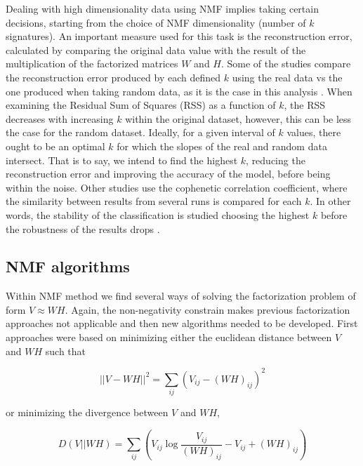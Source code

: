 Dealing with high dimensionality data using NMF implies taking certain decisions, starting from the choice of NMF dimensionality (number of \(k\) signatures). An important measure used for this task is the reconstruction error, calculated by comparing the original data value with the result of the multiplication of the factorized matrices \(W\) and \(H\). Some of the studies compare the reconstruction error produced by each defined \(k\) using the real data vs the one produced when taking random data, as it is the case in this analysis \cite{Frigyesi2008}. When examining the Residual Sum of Squares (RSS) as a function of \(k\), the RSS decreases with increasing \(k\) within the original dataset, however, this can be less the case for the random dataset. Ideally, for a given interval of \(k\) values, there ought to be an optimal \(k\) for which the slopes of the real and random data intersect. That is to say, we intend to find the highest \(k\), reducing the reconstruction error and improving the accuracy of the model, before being within the noise. Other studies use the cophenetic correlation coefficient, where the similarity between results from several runs is compared for each \(k\). In other words, the stability of the classification is studied choosing the highest \(k\) before the robustness of the results drops \cite{Brunet2004}.

\subsection{NMF algorithms}

Within NMF method we find several ways of solving the factorization problem of form \(V \approx W H\). Again, the non-negativity constrain makes previous factorization approaches not applicable and then new algorithms needed to be developed. First approaches \cite{Lee2001} were based on minimizing either the euclidean distance between \(V\) and \(WH\) such that

\begin{equation}
    \vert \vert V - WH \vert \vert ^2 = \sum_{ij} (V_{ij} - (WH)_{ij})^2
\end{equation}

or minimizing the divergence between \(V\) and \(WH\),

\begin{equation}
    D(V \vert \vert WH) = \sum_{ij}\left(V_{ij} \log \frac{V_{ij}}{(WH)_{ij}} - V_{ij} + (WH)_{ij} \right)
\end{equation}

